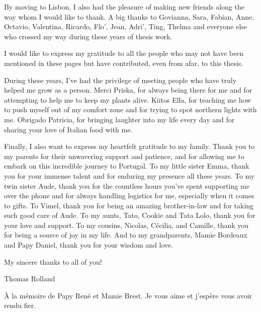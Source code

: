 By moving to Lisbon, I also had the pleasure of making new friends along the way whom I would like to thank. A big thanks to Govianna, Sara, Fabian, Anne, Octavio, Valentina, Ricardo, Flo', Jean, Adri', Ting, Thelma and everyone else who crossed my way during these years of thesis work. 

I would like to express my gratitude to all the people who may not have been mentioned in these pages but have contributed, even from afar, to this thesis.

During these years, I've had the privilege of meeting people who have truly helped me grow as a person. Merci Priska, for always being there for me and for attempting to help me to keep my plants alive. Kiitos Ella, for teaching me how to push myself out of my comfort zone and for trying to spot northern lights with me. Obrigado Patricia, for bringing laughter into my life every day and for sharing your love of Italian food with me.

Finally, I also want to express my heartfelt gratitude to my family. Thank you to my parents for their unwavering support and patience, and for allowing me to embark on this incredible journey to Portugal. To my little sister Emma, thank you for your immense talent and for enduring my presence all these years. To my twin sister Aude, thank you for the countless hours you've spent supporting me over the phone and for always handling logistics for me, especially when it comes to gifts. To Vimel, thank you for being an amazing brother-in-law and for taking such good care of Aude. To my aunts, Tato, Cookie and Tata Lolo, thank you for your love and support. To my cousins, Nicolas, Cécilia, and Camille, thank you for being a source of joy in my life. And to my grandparents, Mamie Bordeaux and Papy Daniel, thank you for your wisdom and love.

My sincere thanks to all of you!

\vspace{1cm}
Thomas Rolland
\vspace*{\fill}
\begin{flushright}
    À la mémoire de Papy René et Mamie Brest. Je vous aime et j'espère vous avoir rendu fier.
\end{flushright}